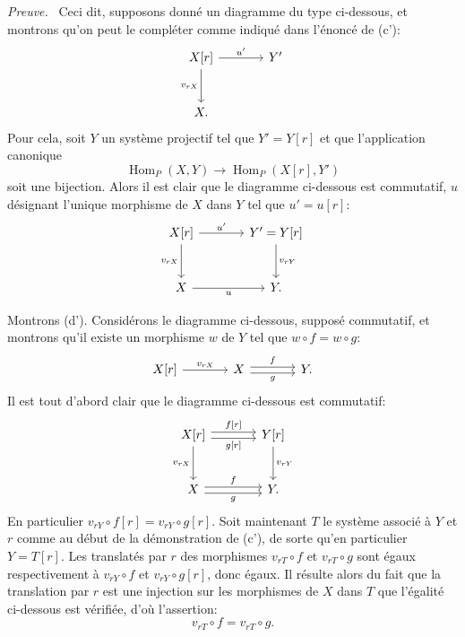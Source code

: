 \documentclass[11pt]{article}
\newenvironment{prooftext}[1][Proof]{\par\noindent\emph{#1.}\ }{\par\medskip}
\DeclareMathOperator{\Hom}{Hom}
\providecommand{\Hom}{\operatorname{Hom}}
\begin{document}
\begin{prooftext}[Preuve]
Ceci dit, supposons donné un diagramme du type ci-dessous, et montrons qu'on peut le compléter comme indiqué dans l'énoncé de (c'):
\[
\begin{tikzcd}[column sep=large,row sep=large]
X[r] \arrow[r,"u'"] \arrow[d,"{v_{rX}}"'] & Y'\\
X .
\end{tikzcd}
\]
Pour cela, soit $Y$ un système projectif tel que $Y'=Y[r]$ et que l'application canonique
\[
\Hom_P(X,Y)\longrightarrow\Hom_P(X[r],Y')
\]
soit une bijection. Alors il est clair que le diagramme ci-dessous est commutatif, $u$ désignant l'unique morphisme de $X$ dans $Y$ tel que $u'=u[r]$:
\[
\begin{tikzcd}[column sep=large,row sep=large]
X[r] \arrow[r,"u'"] \arrow[d,"{v_{rX}}"'] & Y'=Y[r] \arrow[d,"{v_{rY}}"]\\
X \arrow[r,"u"'] & Y .
\end{tikzcd}
\]

Montrons (d'). Considérons le diagramme ci-dessous, supposé commutatif, et montrons qu'il existe un morphisme $w$ de $Y$ tel que $w\circ f=w\circ g$:
\[
\begin{tikzcd}[column sep=large]
X[r] \arrow[r,"{v_{rX}}"] & X \arrow[r,shift left,"f"] \arrow[r,shift right,"g"'] & Y .
\end{tikzcd}
\]
Il est tout d'abord clair que le diagramme ci-dessous est commutatif:
\[
\begin{tikzcd}[column sep=large,row sep=large]
X[r] \arrow[r,shift left,"{f[r]}"] \arrow[r,shift right,"{g[r]}"'] \arrow[d,"{v_{rX}}"'] & Y[r] \arrow[d,"{v_{rY}}"]\\
X \arrow[r,shift left,"f"] \arrow[r,shift right,"g"'] & Y .
\end{tikzcd}
\]
En particulier $v_{rY}\circ f[r]=v_{rY}\circ g[r]$. Soit maintenant $T$ le système associé à $Y$ et $r$ comme au début de la démonstration de (c'), de sorte qu'en particulier $Y=T[r]$. Les translatés par $r$ des morphismes $v_{rT}\circ f$ et $v_{rT}\circ g$ sont égaux respectivement à $v_{rY}\circ f$ et $v_{rY}\circ g[r]$, donc égaux. Il résulte alors du fait que la translation par $r$ est une injection sur les morphismes de $X$ dans $T$ que l'égalité ci-dessous est vérifiée, d'où l'assertion:
\[
v_{rT}\circ f=v_{rT}\circ g.
\]
\end{prooftext}
\end{document}
